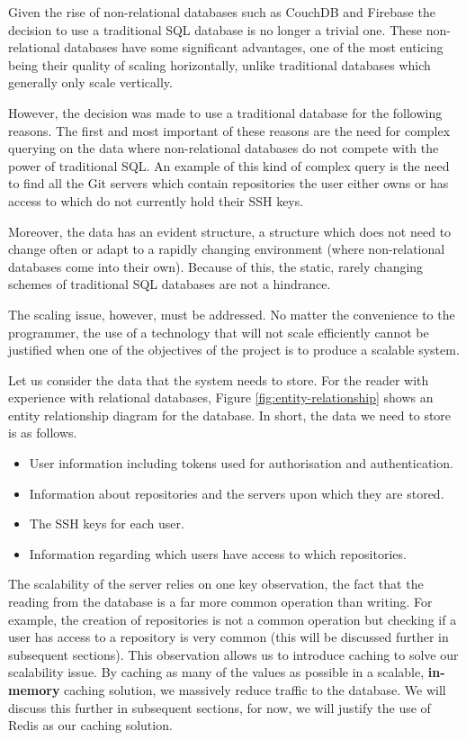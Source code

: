Given the rise of non-relational databases such as CouchDB and Firebase the decision to use a traditional SQL database is no longer a trivial one. These non-relational databases have some significant advantages, one of the most enticing being their quality of scaling horizontally, unlike traditional databases which generally only scale vertically. 

However, the decision was made to use a traditional database for the following reasons. The first and most important of these reasons are the need for complex querying on the data where non-relational databases do not compete with the power of traditional SQL. An example of this kind of complex query is the need to find all the Git servers which contain repositories the user either owns or has access to which do not currently hold their SSH keys.

Moreover, the data has an evident structure, a structure which does not need to change often or adapt to a rapidly changing environment (where non-relational databases come into their own). Because of this, the static, rarely changing schemes of traditional SQL databases are not a hindrance. 

The scaling issue, however, must be addressed. No matter the convenience to the programmer, the use of a technology that will not scale efficiently cannot be justified when one of the objectives of the project is to produce a scalable system. 

Let us consider the data that the system needs to store. For the reader with experience with relational databases, Figure \ref{fig:entity-relationship} shows an entity relationship diagram for the database. In short, the data we need to store is as follows.

\begin{itemize}
\item User information including tokens used for authorisation and authentication.
\item Information about repositories and the servers upon which they are stored.
\item The SSH keys for each user.
\item Information regarding which users have access to which repositories.
\end{itemize}


The scalability of the server relies on one key observation, the fact that the reading from the database is a far more common operation than writing. For example, the creation of repositories is not a common operation but checking if a user has access to a repository is very common (this will be discussed further in subsequent sections). This observation allows us to introduce caching to solve our scalability issue. By caching as many of the values as possible in a scalable, \textbf{in-memory} caching solution, we massively reduce traffic to the database. We will discuss this further in subsequent sections, for now, we will justify the use of Redis \cite{redis} as our caching solution.


